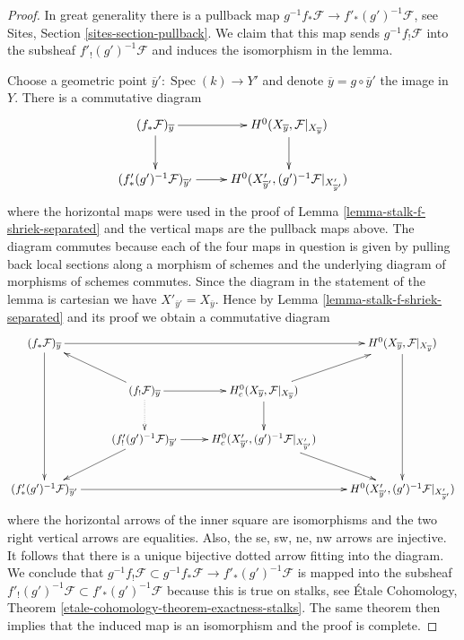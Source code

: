\documentclass{stacks-project}
\theoremstyle{plain}
\theoremstyle{definition}
\theoremstyle{remark}
\numberwithin{equation}{subsection}
\def\Spec{\mathop{\mathrm{Spec}}}
\begin{document}
\begin{proof}
In great generality there is a pullback map
$g^{-1}f_*\mathcal{F} \to f'_*(g')^{-1}\mathcal{F}$, see
Sites, Section \ref{sites-section-pullback}.
We claim that this map sends $g^{-1}f_!\mathcal{F}$
into the subsheaf $f'_!(g')^{-1}\mathcal{F}$
and induces the isomorphism in the lemma.

\medskip\noindent
Choose a geometric point $\overline{y}': \Spec(k) \to Y'$ and denote
$\overline{y} = g \circ \overline{y}'$ the image in $Y$. There is a
commutative diagram
$$
\xymatrix{
(f_*\mathcal{F})_{\overline{y}} \ar[r] \ar[d] &
H^0(X_{\overline{y}}, \mathcal{F}|_{X_{\overline{y}}}) \ar[d] \\
(f'_*(g')^{-1}\mathcal{F})_{\overline{y}'} \ar[r] &
H^0(X'_{\overline{y}'}, (g')^{-1}\mathcal{F}|_{X'_{\overline{y}'}})
}
$$
where the horizontal maps were used in the proof of
Lemma \ref{lemma-stalk-f-shriek-separated}
and the vertical maps are the pullback maps above.
The diagram commutes because each of the four maps
in question is given by pulling back local sections along
a morphism of schemes and the underlying diagram of morphisms
of schemes commutes. Since the diagram in the statement of the lemma
is cartesian we have $X'_{\overline{y}'} = X_{\overline{y}}$.
Hence by Lemma \ref{lemma-stalk-f-shriek-separated}
and its proof we obtain a commutative diagram
$$
\xymatrix{
(f_*\mathcal{F})_{\overline{y}} \ar[rrr] \ar[ddd] & & &
H^0(X_{\overline{y}}, \mathcal{F}|_{X_{\overline{y}}}) \ar[ddd] \\
& (f_!\mathcal{F})_{\overline{y}} \ar[r] \ar@{..>}[d] \ar[lu] &
H^0_c(X_{\overline{y}}, \mathcal{F}|_{X_{\overline{y}}}) \ar[d] \ar[ru] \\
& (f'_!(g')^{-1}\mathcal{F})_{\overline{y}'} \ar[r] \ar[ld] &
H^0_c(X'_{\overline{y}'}, (g')^{-1}\mathcal{F}|_{X'_{\overline{y}'}}) \ar[rd]\\
(f'_*(g')^{-1}\mathcal{F})_{\overline{y}'} \ar[rrr] & & &
H^0(X'_{\overline{y}'}, (g')^{-1}\mathcal{F}|_{X'_{\overline{y}'}})
}
$$
where the horizontal arrows of the inner square are isomorphisms
and the two right vertical arrows are equalities. Also, the
se, sw, ne, nw arrows are injective. It follows that there is a unique
bijective dotted arrow fitting into the diagram. We conclude that
$g^{-1}f_!\mathcal{F} \subset g^{-1}f_*\mathcal{F} \to f'_*(g')^{-1}\mathcal{F}$
is mapped into the subsheaf
$f'_!(g')^{-1}\mathcal{F} \subset f'_*(g')^{-1}\mathcal{F}$
because this is true on stalks, see
\'Etale Cohomology, Theorem \ref{etale-cohomology-theorem-exactness-stalks}.
The same theorem then implies that the induced map is an isomorphism
and the proof is complete.
\end{proof}
\end{document}
